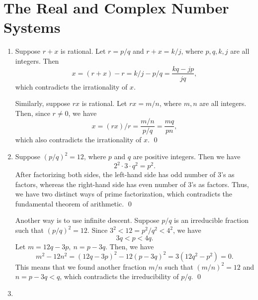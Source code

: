 
\chapter{The Real and Complex Number Systems}
\label{ch:01}

\begin{enumerate}
\item Suppose \(r+x\) is rational.  Let \(r = p/q\) and \(r+x = k/j\), where \(p,q,k,j\) are all integers.  Then
  \begin{equation*}
    x = (r+x) - r = k/j - p/q = \frac{kq - jp}{jq},
  \end{equation*}
  which contradicts the irrationality of \(x\).

  Similarly, suppose \(rx\) is rational.  Let \(rx = m/n\), where \(m,n\) are all integers.  Then, since \(r \ne 0\), we have
  \begin{equation*}
    x = (rx)/r = \frac{m/n}{p/q} = \frac{mq}{pn},
  \end{equation*}
  which also contradicts the irrationality of \(x\).
  \qed

\item Suppose \((p/q)^2 = 12\), where \(p\) and \(q\) are positive integers.  Then we have
  \begin{equation*}
    2^2 \cdot 3 \cdot q^2 = p^2.
  \end{equation*}
  After factorizing both sides, the left-hand side has odd number of \(3\)'s as factors, whereas the right-hand side has even number of \(3\)'s as factors.  Thus, we have two distinct ways of prime factorization, which contradicts the fundamental theorem of arithmetic.
  \qed

  Another way is to use infinite descent. Suppose \(p/q\) is an irreducible fraction such that \((p/q)^2 = 12\).  Since \(3^2 < 12 = p^2/q^2 < 4^2\), we have
  \begin{equation*}
    3q < p < 4q.
  \end{equation*}
  Let \(m = 12q - 3p,\ n = p - 3q\). Then, we have
  \begin{equation*}
    m^2 - 12n^2
    = (12q - 3p)^2 - 12(p - 3q)^2
    = 3(12q^2 - p^2)
    = 0.
  \end{equation*}
  This means that we found another fraction \(m/n\) such that \((m/n)^2 = 12\) and \(n = p - 3q < q\), which contradicts the irreducibility of \(p/q\).
  \qed

\item 
\end{enumerate}

